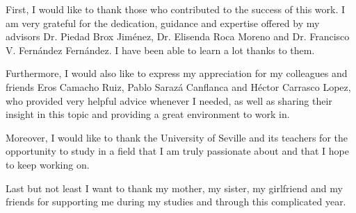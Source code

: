 First, I would like to thank those who contributed to the success of this work. I am very grateful for the dedication, guidance and expertise offered by my advisors Dr. Piedad Brox Jiménez, Dr. Elisenda Roca Moreno and Dr. Francisco V. Fernández Fernández. I have been able to learn a lot thanks to them.

Furthermore, I would also like to express my appreciation for my colleagues and friends Eros Camacho Ruiz, Pablo Sarazá Canflanca and Héctor Carrasco Lopez, who provided very helpful advice whenever I needed, as well as sharing their insight in this topic and providing a great environment to work in. 

Moreover, I would like to thank the University of Seville and its teachers for the opportunity to study in a field that I am truly passionate about and that I hope to keep working on.   

Last but not least I want to thank my mother, my sister, my girlfriend and my friends for supporting me during my studies and through this complicated year.